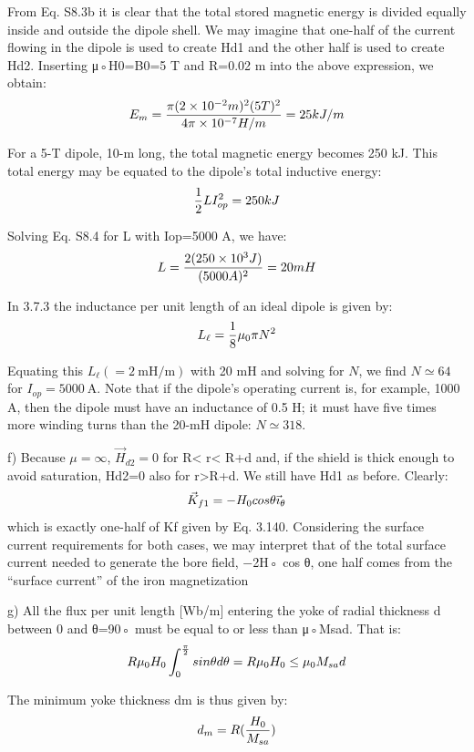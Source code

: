 From Eq. S8.3b it is clear that the total stored magnetic energy is divided equally
inside and outside the dipole shell. We may imagine that one-half of the current
flowing in the dipole is used to create Hd1 and the other half is used to create Hd2.
Inserting μ◦H0=B0=5 T and R=0.02 m into the above expression, we obtain:
$$
E_{m}=\frac{\pi(2\times 10^{-2}m)^{2}(5T)^{2}}{4\pi\times10^{-7}H/m}=25kJ/m\\
$$

For a 5-T dipole, 10-m long, the total magnetic energy becomes 250 kJ. This total
energy may be equated to the dipole’s total inductive energy:
$$
\frac{1}{2}LI_{op}^{2}=250kJ\\%
$$

Solving Eq. S8.4 for L with Iop=5000 A, we have:
$$
L=\frac{2(250\times10^{3}J)}{(5000A)^{2}}\\=20mH\\
$$

In 3.7.3 the inductance per unit length of an ideal dipole is given by:
$$
L_{\ell}=\frac{1}{8}\mu_{0}\pi N^{2}\\%
$$

Equating this $L_{\ell}(=2\ \mathrm{mH/m})$ with 20 mH and solving for $N$, we find $N\simeq 64$ for
$I_{op} = 5000\ \mathrm{A}$. Note that if the dipole’s operating current is, for example, 1000 A,
then the dipole must have an inductance of 0.5 H; it must have five times more
winding turns than the 20-mH dipole: $N\simeq 318$.

f) Because $\mu=\infty$, $\vec{H}_{d2}=0$ for R< r< R+d and, if the shield is thick enough to
avoid saturation, Hd2=0 also for r>R+d. We still have Hd1 as before. Clearly:
$$
\vec{K}_{f1}=-H_{0}cos\theta\vec{\imath}_{\theta}\\%
$$
which is exactly one-half of Kf given by Eq. 3.140. Considering the surface current
requirements for both cases, we may interpret that of the total surface current
needed to generate the bore field, −2H◦ cos θ, one half comes from the “surface
current” of the iron magnetization

g) All the flux per unit length [Wb/m] entering the yoke of radial thickness d
between 0 and θ=90◦ must be equal to or less than μ◦Msad. That is:
$$
R\mu_{0}H_{0}\int_{0}^{\frac{\pi}{2}}sin\theta d\theta=R\mu_{0}H_{0}\leq\mu_{0}M_{sa}d\\%
$$

The minimum yoke thickness dm is thus given by:
$$
d_{m}=R(\frac{H_{0}}{M_{sa}})\\%
$$

